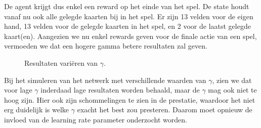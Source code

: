\documentclass[11pt]{article}
\begin{document}
\noindent De agent krijgt dus enkel een reward op het einde van het spel. De state houdt vanaf nu ook alle gelegde kaarten bij in het spel. Er zijn 13 velden voor de eigen hand, 13 velden voor de gelegde kaarten in het spel, en 2 voor de laatst gelegde kaart(en). Aangezien we nu enkel rewards geven voor de finale actie van een spel, vermoeden we dat een hogere gamma betere resultaten zal geven.
\begin{figure}[H]
    \centering
    \qquad
    \caption{Resultaten variëren van $\gamma$.}
\end{figure}
\noindent Bij het simuleren van het netwerk met verschillende waarden van $\gamma$, zien we dat voor lage $\gamma$ inderdaad lage resultaten worden behaald, maar de $\gamma$ mag ook niet te hoog zijn. Hier ook zijn schommelingen te zien in de prestatie, waardoor het niet erg duidelijk is welke $\gamma$ exacht het best zou presteren. Daarom moet opnieuw de invloed van de learning rate parameter onderzocht worden. 
\end{document}
